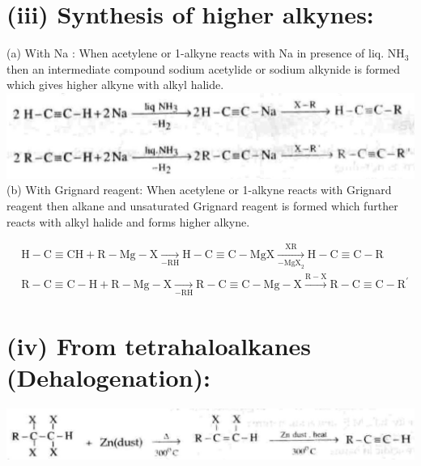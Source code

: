 \documentclass[10pt]{article}
\begin{document}
\section*{(iii) Synthesis of higher alkynes:}
(a) With Na : When acetylene or 1-alkyne reacts with Na in presence of liq. $\mathrm{NH}_{3}$ then an intermediate compound sodium acetylide or sodium alkynide is formed which gives higher alkyne with alkyl halide.\\
\includegraphics[max width=\textwidth, center]{2025_01_28_8470952b98110cec3aabg-187(1)}\\
(b) With Grignard reagent: When acetylene or 1-alkyne reacts with Grignard reagent then alkane and unsaturated Grignard reagent is formed which further reacts with alkyl halide and forms higher alkyne.

$$
\begin{aligned}
& \mathrm{H}-\mathrm{C} \equiv \mathrm{CH}+\mathrm{R}-\mathrm{Mg}-\mathrm{X} \xrightarrow[-\mathrm{RH}]{ } \mathrm{H}-\mathrm{C} \equiv \mathrm{C}-\mathrm{MgX} \xrightarrow[-\mathrm{MgX}_{2}]{\mathrm{XR}} \mathrm{H}-\mathrm{C} \equiv \mathrm{C}-\mathrm{R} \\
& \mathrm{R}-\mathrm{C} \equiv \mathrm{C}-\mathrm{H}+\mathrm{R}-\mathrm{Mg}-\mathrm{X} \xrightarrow[-\mathrm{RH}]{ } \mathrm{R}-\mathrm{C} \equiv \mathrm{C}-\mathrm{Mg}-\mathrm{X} \xrightarrow{\mathrm{R}-\mathrm{X}} \mathrm{R}-\mathrm{C} \equiv \mathrm{C}-\mathrm{R}^{\prime}
\end{aligned}
$$

\section*{(iv) From tetrahaloalkanes (Dehalogenation):}
\begin{center}
\includegraphics[max width=\textwidth]{2025_01_28_8470952b98110cec3aabg-187(2)}
\end{center}
\end{document}
